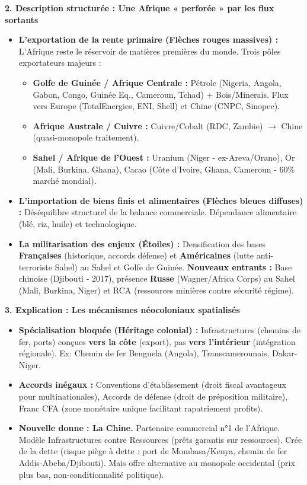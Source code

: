 \documentclass[11pt]{article}
\newcommand{\cle}[1]{{\popxbold\color{popdark}#1}}
\begin{document}
\begin{exoresolu}
\textbf{2. Description structurée : Une Afrique « perforée » par les flux sortants}
\begin{itemize}
    \item \textbf{L'exportation de la rente primaire (Flèches rouges massives) :} L'Afrique reste le \cle{réservoir de matières premières} du monde. Trois pôles exportateurs majeurs :
        \begin{itemize}
            \item \textbf{Golfe de Guinée / Afrique Centrale :} Pétrole (Nigeria, Angola, Gabon, Congo, Guinée Eq., Cameroun, Tchad) + Bois/Minerais. Flux vers Europe (TotalEnergies, ENI, Shell) et Chine (CNPC, Sinopec).
            \item \textbf{Afrique Australe / Cuivre :} Cuivre/Cobalt (RDC, Zambie) $\to$ Chine (quasi-monopole traitement).
            \item \textbf{Sahel / Afrique de l'Ouest :} Uranium (Niger - ex-Areva/Orano), Or (Mali, Burkina, Ghana), Cacao (Côte d'Ivoire, Ghana, Cameroun - 60\% marché mondial).
        \end{itemize}
    \item \textbf{L'importation de biens finis et alimentaires (Flèches bleues diffuses) :} Déséquilibre structurel de la balance commerciale. Dépendance alimentaire (blé, riz, huile) et technologique.
    \item \textbf{La militarisation des enjeux (Étoiles) :} Densification des bases \textbf{Françaises} (historique, accords défense) et \textbf{Américaines} (lutte anti-terroriste Sahel) au Sahel et Golfe de Guinée. \textbf{Nouveaux entrants :} Base chinoise (Djibouti - 2017), présence \textbf{Russe} (Wagner/Africa Corps) au Sahel (Mali, Burkina, Niger) et RCA (ressources minières contre sécurité régime).
\end{itemize}

\textbf{3. Explication : Les mécanismes néocoloniaux spatialisés}
\begin{itemize}
    \item \textbf{Spécialisation bloquée (Héritage colonial) :} Infrastructures (chemins de fer, ports) conçues \textbf{vers la côte} (export), pas \textbf{vers l'intérieur} (intégration régionale). Ex: Chemin de fer Benguela (Angola), Transcamerounais, Dakar-Niger.
    \item \textbf{Accords inégaux :} \cle{Conventions d'établissement} (droit fiscal avantageux pour multinationales), \cle{Accords de défense} (droit de préposition militaire), \cle{Franc CFA} (zone monétaire unique facilitant rapatriement profits).
    \item \textbf{Nouvelle donne : La Chine.} Partenaire commercial n°1 de l'Afrique. Modèle \cle{Infrastructures contre Ressources} (prêts garantis sur ressources). Crée de la dette (risque \cle{piège à dette} : port de Mombasa/Kenya, chemin de fer Addis-Abeba/Djibouti). Mais offre alternative au monopole occidental (prix plus bas, non-conditionnalité politique).
\end{itemize}


\end{exoresolu}
\end{document}
